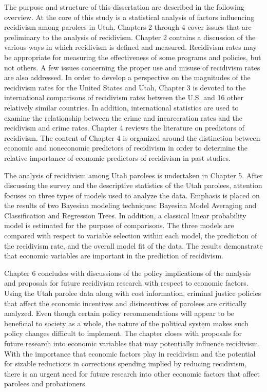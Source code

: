 The purpose and structure of this dissertation are described in the following overview.  At the core of this study is a statistical analysis of factors influencing recidivism among parolees in Utah.  Chapters 2 through 4 cover issues that are preliminary to the analysis of recidivism.  Chapter 2 contains a discussion of the various ways in which recidivism is defined and measured.  Recidivism rates may be appropriate for measuring the effectiveness of some programs and policies, but not others.  A few issues concerning the proper use and misuse of recidivism rates are also addressed.  In order to develop a perspective on the magnitudes of the recidivism rates for the United States and Utah, Chapter 3 is devoted to the international comparisons of recidivism rates between the U.S. and 16 other relatively similar countries.  In addition, international statistics are used to examine the relationship between the crime and incarceration rates and the recidivism and crime rates.  Chapter 4 reviews the literature on predictors of recidivism.  The content of Chapter 4 is organized around the distinction between economic and noneconomic predictors of recidivism in order to determine the relative importance of economic predictors of recidivism in past studies.

The analysis of recidivism among Utah parolees is undertaken in Chapter 5.  After discussing the survey and the descriptive statistics of the Utah parolees, attention focuses on three types of models used to analyze the data.  Emphasis is placed on the results of two Bayesian modeling techniques:  Bayesian Model Averaging and Classification and Regression Trees.  In addition, a classical linear probability model is estimated for the purpose of comparisons.  The three models are compared with respect to variable selection within each model, the prediction of the recidivism rate, and the overall model fit of the data.  The results demonstrate that economic variables are important in the prediction of recidivism.

Chapter 6 concludes with discussions of the policy implications of the analysis and proposals for future recidivism research with respect to economic factors.  Using the Utah parolee data along with cost information, criminal justice policies that affect the economic incentives and disincentives of parolees are critically analyzed.  Even though certain policy recommendations will appear to be beneficial to society as a whole, the nature of the political system makes such policy changes difficult to implement.  The chapter closes with proposals for future research into economic variables that may potentially influence recidivism.  With the importance that economic factors play in recidivism and the potential for sizable reductions in corrections spending implied by reducing recidivism, there is an urgent need for future research into other economic factors that affect parolees and probationers.



